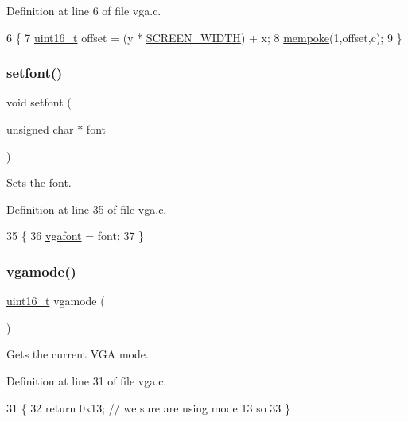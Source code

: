 Definition at line 6 of file vga.\+c.


\begin{DoxyCode}
6                                                  \{
7     \hyperlink{a00104_a273cf69d639a59973b6019625df33e30_a273cf69d639a59973b6019625df33e30}{uint16\_t} offset = (y * \hyperlink{a00038_a2cd109632a6dcccaa80b43561b1ab700_a2cd109632a6dcccaa80b43561b1ab700}{SCREEN\_WIDTH}) + x;
8     \hyperlink{a00116_a2de854ee97d4e6d27f7aa7899a2d1d32_a2de854ee97d4e6d27f7aa7899a2d1d32}{mempoke}(1,offset,c);
9 \}
\end{DoxyCode}
\mbox{\label{a00038_abb01dc16ea34f0a6de3d10d732b6c536_abb01dc16ea34f0a6de3d10d732b6c536}} 
\subsubsection{\texorpdfstring{setfont()}{setfont()}}
{\footnotesize\ttfamily void setfont (\begin{DoxyParamCaption}\item[{unsigned char $\ast$}]{font }\end{DoxyParamCaption})}



Sets the font. 



Definition at line 35 of file vga.\+c.


\begin{DoxyCode}
35                                   \{
36     \hyperlink{a00035_a586c0ac088deb9338d9b1464dcd587c8_a586c0ac088deb9338d9b1464dcd587c8}{vgafont} = font;
37 \}
\end{DoxyCode}
\mbox{\label{a00038_af6d170c9401ea8f94d4c5cf09347cca7_af6d170c9401ea8f94d4c5cf09347cca7}} 
\subsubsection{\texorpdfstring{vgamode()}{vgamode()}}
{\footnotesize\ttfamily \hyperlink{a00104_a273cf69d639a59973b6019625df33e30_a273cf69d639a59973b6019625df33e30}{uint16\+\_\+t} vgamode (\begin{DoxyParamCaption}{ }\end{DoxyParamCaption})}



Gets the current V\+GA mode. 



Definition at line 31 of file vga.\+c.


\begin{DoxyCode}
31                    \{
32     \textcolor{keywordflow}{return} 0x13; \textcolor{comment}{// we sure are using mode 13 so}
33 \}
\end{DoxyCode}
